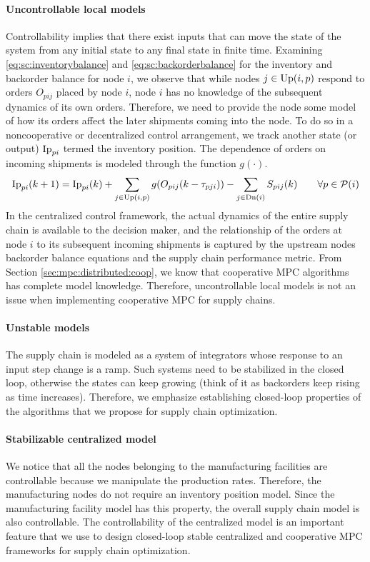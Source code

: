 \paragraph{Uncontrollable local models} Controllability implies that there
  exist inputs that can move the state of the system from any initial
  state to any final state in finite time. Examining
  \eqref{eq:sc:inventorybalance} and \eqref{eq:sc:backorderbalance} for the 
  inventory and backorder balance  for node $i$, we observe that
  while nodes $j \in \textrm{Up}(i,p)$ respond to orders $O_{pij}$ placed by node
  $i$, node $i$ has no knowledge of the subsequent dynamics of its own
  orders. Therefore, we need to provide the node 
  some model of how its orders affect the later shipments coming into the
  node. To do so in a noncooperative or decentralized control
  arrangement, we track another state (or output) $\textrm{Ip}_{pi}$ termed the
  inventory position. The dependence of orders on incoming
  shipments is modeled through the function $g(\cdot)$.
\begin{equation*}
\textrm{Ip}_{pi}(k+1) = \textrm{Ip}_{pi}(k) + \sum_{j \in \textrm{Up}(i,p)}g(O_{pij}(k-\tau_{pji}))
- \sum_{j \in \textrm{Dn}(i)}S_{pij}(k) \qquad \forall p \in \mathcal{P}(i) 
\end{equation*}
In the centralized control framework, the actual dynamics of the entire
  supply chain is available to the decision maker, and the
  relationship of the orders at node $i$ to its subsequent incoming shipments is
  captured by the upstream nodes backorder balance equations and the
  supply chain performance metric. From Section
  \ref{sec:mpc:distributed:coop}, we know that cooperative MPC
  algorithms has complete model knowledge. Therefore, uncontrollable
  local models is not an issue when implementing cooperative MPC for
  supply chains.
\paragraph{Unstable models} The supply chain is
  modeled as a system of integrators whose
  response to an input step change is a ramp. Such systems
  need to be stabilized in the closed loop, otherwise the states can
  keep growing (think of it as backorders keep rising as time
  increases). Therefore, we emphasize establishing closed-loop
  properties 
  of the algorithms that we propose for supply chain optimization.
\paragraph{Stabilizable centralized model} We notice that all the
  nodes belonging to the manufacturing facilities are controllable
  because we manipulate the production rates. Therefore,  the
  manufacturing nodes do not require an inventory position
  model. Since the manufacturing 
  facility model has this property, the overall supply chain model is
  also controllable. The controllability of the centralized model is an
  important feature that we use to design closed-loop stable
  centralized and cooperative MPC frameworks for supply chain
  optimization.

